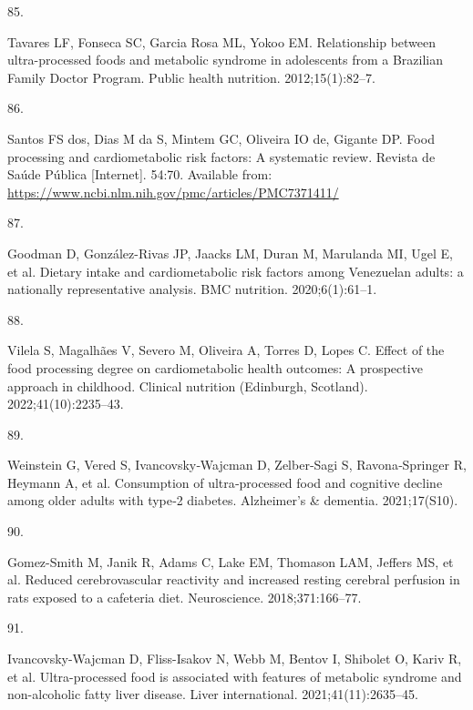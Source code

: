 \documentclass[
]{article}
\newlength{\cslhangindent}
\newlength{\csllabelwidth}
\newlength{\cslentryspacingunit} %
\newenvironment{CSLReferences}[2] %
 {%
  \setlength{\parindent}{0pt}
  \ifodd #1
  \let\oldpar\par
  \def\par{\hangindent=\cslhangindent\oldpar}
  \fi
  \setlength{\parskip}{#2\cslentryspacingunit}
 }%
 {}
\newcommand{\CSLLeftMargin}[1]{\parbox[t]{\csllabelwidth}{#1}}
\newcommand{\CSLRightInline}[1]{\parbox[t]{\linewidth - \csllabelwidth}{#1}\break}
\begin{document}
\begin{CSLReferences}{0}{0}
\leavevmode{}%
\CSLLeftMargin{85. }%
\CSLRightInline{Tavares LF, Fonseca SC, Garcia Rosa ML, Yokoo EM.
Relationship between ultra-processed foods and metabolic syndrome in
adolescents from a {Brazilian Family Doctor Program}. Public health
nutrition. 2012;15(1):82--7. }

\leavevmode{}%
\CSLLeftMargin{86. }%
\CSLRightInline{Santos FS dos, Dias M da S, Mintem GC, Oliveira IO de,
Gigante DP. Food processing and cardiometabolic risk factors: A
systematic review. Revista de Saúde Pública {[}Internet{]}. 54:70.
Available from:
\url{https://www.ncbi.nlm.nih.gov/pmc/articles/PMC7371411/}}

\leavevmode{}%
\CSLLeftMargin{87. }%
\CSLRightInline{Goodman D, González-Rivas JP, Jaacks LM, Duran M,
Marulanda MI, Ugel E, et al. Dietary intake and cardiometabolic risk
factors among Venezuelan adults: a nationally representative analysis.
BMC nutrition. 2020;6(1):61--1. }

\leavevmode{}%
\CSLLeftMargin{88. }%
\CSLRightInline{Vilela S, Magalhães V, Severo M, Oliveira A, Torres D,
Lopes C. Effect of the food processing degree on cardiometabolic health
outcomes: {A} prospective approach in childhood. Clinical nutrition
(Edinburgh, Scotland). 2022;41(10):2235--43. }

\leavevmode{}%
\CSLLeftMargin{89. }%
\CSLRightInline{Weinstein G, Vered S, Ivancovsky‐Wajcman D, Zelber‐Sagi
S, Ravona‐Springer R, Heymann A, et al. Consumption of ultra‐processed
food and cognitive decline among older adults with type‐2 diabetes.
Alzheimer's \& dementia. 2021;17(S10). }

\leavevmode{}%
\CSLLeftMargin{90. }%
\CSLRightInline{Gomez-Smith M, Janik R, Adams C, Lake EM, Thomason LAM,
Jeffers MS, et al. Reduced cerebrovascular reactivity and increased
resting cerebral perfusion in rats exposed to a cafeteria diet.
Neuroscience. 2018;371:166--77. }

\leavevmode{}%
\CSLLeftMargin{91. }%
\CSLRightInline{Ivancovsky-Wajcman D, Fliss-Isakov N, Webb M, Bentov I,
Shibolet O, Kariv R, et al. Ultra{-}processed food is associated with
features of metabolic syndrome and non{-}alcoholic fatty liver disease.
Liver international. 2021;41(11):2635--45. }


\end{CSLReferences}
\end{document}
